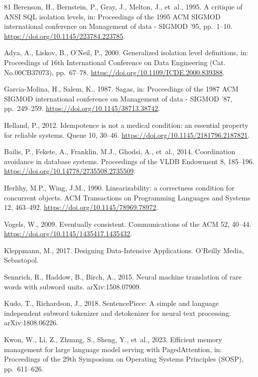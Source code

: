 \documentclass[final,5p,times,twocolumn,number]{elsarticle}
\begin{document}
\begin{thebibliography}{81}
Berenson, H., Bernstein, P., Gray, J., Melton, J., et~al., 1995. A critique of ANSI SQL isolation levels, in: Proceedings of the 1995 ACM SIGMOD international conference on Management of data  - SIGMOD '95, pp.~1--10. \url{https://doi.org/10.1145/223784.223785}.

Adya, A., Liskov, B., O'Neil, P., 2000. Generalized isolation level definitions, in: Proceedings of 16th International Conference on Data Engineering (Cat. No.00CB37073), pp.~67--78. \url{https://doi.org/10.1109/ICDE.2000.839388}.

Garcia-Molina, H., Salem, K., 1987. Sagas, in: Proceedings of the 1987 ACM SIGMOD international conference on Management of data  - SIGMOD '87, pp.~249--259. \url{https://doi.org/10.1145/38713.38742}.

Helland, P., 2012. Idempotence is not a medical condition: an essential property for reliable systems. Queue 10, 30--46. \url{https://doi.org/10.1145/2181796.2187821}.

Bailis, P., Fekete, A., Franklin, M.J., Ghodsi, A., et~al., 2014. Coordination avoidance in database systems. Proceedings of the VLDB Endowment 8, 185--196. \url{https://doi.org/10.14778/2735508.2735509}.

Herlihy, M.P., Wing, J.M., 1990. Linearizability: a correctness condition for concurrent objects. ACM Transactions on Programming Languages and Systems 12, 463--492. \url{https://doi.org/10.1145/78969.78972}.

Vogels, W., 2009. Eventually consistent. Communications of the ACM 52, 40--44. \url{https://doi.org/10.1145/1435417.1435432}.

Kleppmann, M., 2017. Designing Data-Intensive Applications. O'Reilly Media, Sebastopol.

Sennrich, R., Haddow, B., Birch, A., 2015. Neural machine translation of rare words
with subword units. arXiv:1508.07909.

Kudo, T., Richardson, J., 2018. SentencePiece: A simple and language independent
subword tokenizer and detokenizer for neural text processing. arXiv:1808.06226.

Kwon, W., Li, Z., Zhuang, S., Sheng, Y., et~al., 2023. Efficient memory management for
large language model serving with PagedAttention, in: Proceedings of the 29th Symposium
on Operating Systems Principles (SOSP), pp.~611--626.


\end{thebibliography}
\end{document}

